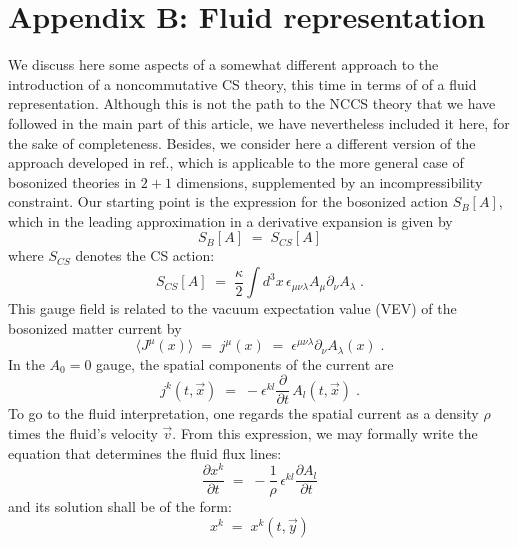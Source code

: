 \documentclass[a4paper,12pt]{article}
\begin{document}
\section*{Appendix B: Fluid representation}\label{sec:fluid}
We discuss here some aspects of a somewhat different approach to
the
introduction of a noncommutative CS theory, this time in terms of
of a
fluid representation. Although this is not the path to the NCCS
theory
that we have followed in the main part of this article, we have
nevertheless included it here, for the sake of completeness.
Besides,
we consider here a different version of the approach developed in
ref.\cite{susskind}, which is applicable to the more general case
of
bosonized theories in $2+1$ dimensions, supplemented by an
incompressibility constraint.  Our starting point is the expression
for the bosonized action $S_B[A]$, which in the leading
approximation
in a derivative expansion is given by
\begin{equation}
  \label{eq:boson}
S_B[A] \;=\; S_{CS}[A] 
\end{equation}
where $S_{CS}$ denotes the CS action:
\begin{equation}
  \label{eq:defscs}
S_{CS}[A] \;=\; \frac{\kappa}{2} \int d^3x
\,\epsilon_{\mu\nu\lambda} 
A_\mu \partial_\nu A_\lambda \;. 
\end{equation}
This gauge field is related to the vacuum expectation value (VEV)
of
the bosonized matter current by
\begin{equation}
  \label{eq:br}
\langle J^\mu(x) \rangle \;=\; j^\mu (x) \;=\; 
\epsilon^{\mu\nu\lambda} \partial_\nu A_\lambda (x) \;.
\end{equation}
In the $A_0=0$ gauge, the spatial components of the current are
\begin{equation}
  \label{eq:br1}
j^k (t,{\vec x}) \;=\; - \epsilon^{kl} \frac{\partial}{\partial t}
\, 
A_l (t,{\vec x})\;.
\end{equation}
To go to the fluid interpretation, one regards the spatial current
as
a density $\rho$ times the fluid's velocity ${\vec v}$. From this
expression, we may formally write the equation that determines the
fluid flux lines:
\begin{equation}
  \label{eq:fl}
\frac{\partial x^k}{\partial t} \;=\; - \frac{1}{\rho} \,
\epsilon^{kl} \frac{\partial A_l}{\partial t}          
\end{equation}
and its solution shall be of the form:
\begin{equation}
  \label{eq:fls}
x^k \;=\; x^k(t,{\vec y})
\end{equation}
\end{document}

